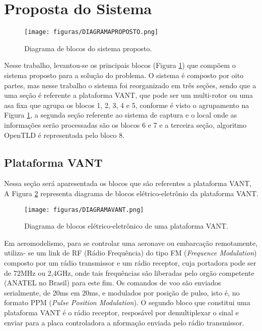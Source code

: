\section{Proposta do Sistema}

\begin{figure}
	\centering
	\texttt{[image: figuras/DIAGRAMAPROPOSTO.png]}
    \caption{Diagrama de blocos do sistema proposto.}
    \label{DIAGRAMAPROPOSTO}
\end{figure}

Nesse trabalho, levantou-se os principais blocos (Figura \ref{DIAGRAMAPROPOSTO}) que compõem o sistema proposto para a solução do problema. O sistema é composto por oito partes, mas nesse trabalho o sistema foi reorganizado em três seções, sendo que a uma seção é referente a plataforma VANT, que pode ser um multi-rotor ou uma asa fixa que agrupa os blocos 1, 2, 3, 4 e 5, conforme é visto o agrupamento na Figura \ref{DIAGRAMAPROPOSTO}, a segunda seção referente ao sistema de captura e o local onde as informações serão processadas são os blocos 6 e 7 e a terceira seção, algoritmo OpenTLD é representada pelo bloco 8.

\subsection{Plataforma VANT}
Nessa seção será aparesentada os blocos que são referentes a plataforma VANT,  A Figura \ref{DIAGRAMAVANT} representa diagrama de blocos elétrico-eletrônio da plataforma VANT.

\begin{figure}
	\centering
	\texttt{[image: figuras/DIAGRAMAVANT.png]}
    \caption{Diagrama de blocos elétrico-eletrônico de uma plataforma VANT.}
    \label{DIAGRAMAVANT}
\end{figure}

Em aeromodelismo, para se controlar uma aeronave ou embarcação remotamente, utiliza- se um link de RF (Rádio Frequência) do tipo FM (\textit{Frequence Modulation}) composto por um rádio transmissor e um rádio receptor, cuja portadora pode ser de 72MHz ou 2,4GHz, onde tais frequências são liberadas pelo orgão competente (ANATEL no Brasil) para este fim. Os comandos de voo são enviados serialmente, de 20ms em 20ms, e modulados por posição de pulso, isto é, no formato PPM (\textit{Pulse Position Modulation}). O segundo bloco que constitui uma plataforma VANT é o rádio receptor, resposável por demultiplexar o sinal e enviar para a placa controladora a nformação enviada pelo rádio transmissor.

